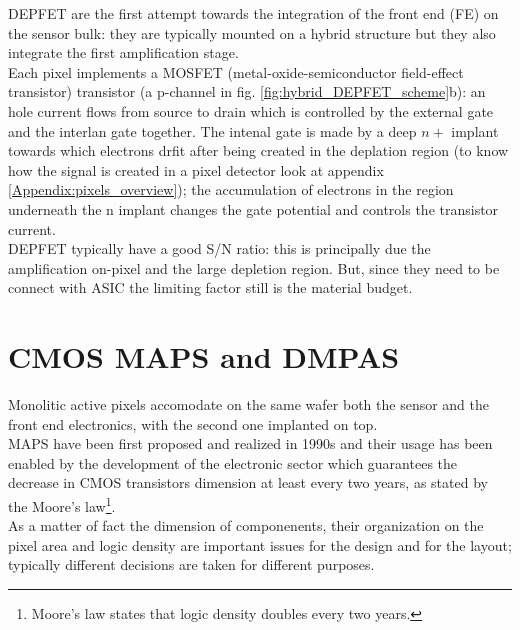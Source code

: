    DEPFET are the first attempt towards the integration of the front end (FE) on the sensor bulk: they are typically mounted on a hybrid structure but they also integrate the first amplification stage.\\
   Each pixel implements a MOSFET (metal-oxide-semiconductor field-effect transistor) transistor (a p-channel in fig. \ref{fig:hybrid_DEPFET_scheme}b): an hole current flows from source to drain which is controlled by the external gate and the interlan gate together. The intenal gate is made by a deep $n+$ implant towards which electrons drfit after being created in the deplation region (to know how the signal is created in a pixel detector look at appendix \ref{Appendix:pixels_overview}); the accumulation of electrons in the region underneath the n implant changes the gate potential and controls the transistor current.\\
   DEPFET typically have a good S/N ratio: this is principally due the amplification on-pixel and the large depletion region. But, since they need to be connect with ASIC the limiting factor still is the material budget.

\section{CMOS MAPS and DMPAS}
   Monolitic active pixels accomodate on the same wafer both the sensor and the front end electronics, with the second one implanted on top. \\
   MAPS have been first proposed and realized in 1990s and their usage has been enabled by the development of the electronic sector which guarantees the decrease in CMOS transistors dimension at least every two years, as stated by the Moore's law\footnote{Moore's law states that logic density doubles every two years.}.\\
   As a matter of fact the dimension of componenents, their organization on the pixel area and logic density are important issues for the design and for the layout; typically different decisions are taken for different purposes.

